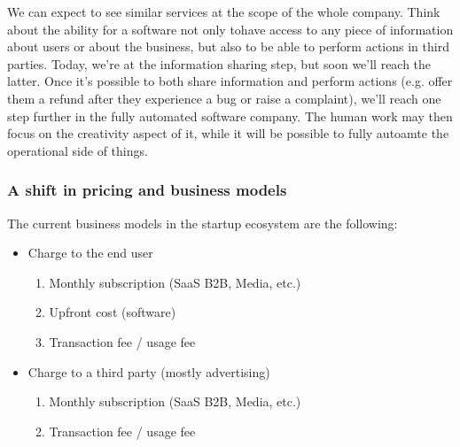 \documentclass[12pt]{article}
\begin{document}
\smallskip

We can expect to see similar services at the scope of the whole company. Think
about the ability for a software not only tohave access to any piece of
information about users or about the business, but also to be able to perform
actions in third parties. Today, we're at the information sharing step, but soon
we'll reach the latter. Once it's possible to both share information and perform
actions (e.g. offer them a refund after they experience a bug or raise a
complaint), we'll reach one step further in the fully automated software
company. The human work may then focus on the creativity aspect of it, while it
will be possible to fully autoamte the operational side of things.

\subsubsection{A shift in pricing and business models}
The current business models in the startup ecosystem are the following:
\begin{itemize}
  \item Charge to the end user
  \begin{enumerate}
    \item Monthly subscription (SaaS B2B, Media, etc.)
    \item Upfront cost (software)
    \item Transaction fee / usage fee
  \end{enumerate}
  \item Charge to a third party (mostly advertising)
  \begin{enumerate}
    \item Monthly subscription (SaaS B2B, Media, etc.)
    \item Transaction fee / usage fee
  \end{enumerate}
\end{itemize}
\end{document}
